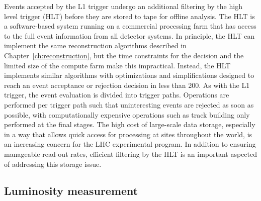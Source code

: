 Events accepted by the L1 trigger undergo an additional filtering 
by the high level trigger (HLT) before they are stored to tape for offline analysis.
The HLT is a software-based system running on a commercial processing farm that
has access to the full event information from all detector systems. In principle,
the HLT can implement the same reconstruction algorithms described in Chapter~\ref{ch:reconstruction},
but the time constraints for the decision and the limited size of the compute farm
make this impractical. Instead, the HLT implements similar algorithms with
optimizations and simplifications designed to reach an event acceptance or rejection
decision in less than 200\mus. As with the L1 trigger, the event evaluation is
divided into trigger paths. Operations are performed per trigger path such that
uninteresting events are rejected as soon as possible, with computationally
expensive operations such as track building only performed at the final stages.
The high cost of large-scale data storage, especially in a way that allows quick access 
for processing at sites throughout the world, is an increasing concern for the
LHC experimental program. In addition to ensuring manageable read-out rates,
efficient filtering by the HLT is an important aspected of addressing this storage issue.

\label{sec:triggering}
\subsection{Luminosity measurement}

